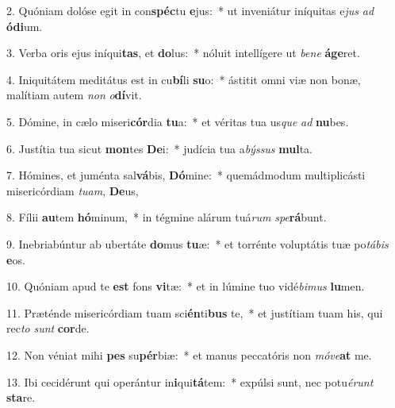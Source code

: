 2. Quóniam dolóse egit in con\textbf{spéc}tu \textbf{e}jus:~*  ut inveniátur iníquitas e\textit{jus} \textit{ad} \textbf{ó}\textbf{di}um.\

3. Verba oris ejus iníqui\textbf{tas}, et \textbf{do}lus:~*  nóluit intellígere ut \textit{be}\textit{ne} \textbf{á}\textbf{ge}ret.\

4. Iniquitátem meditátus est in cu\textbf{bí}li \textbf{su}o:~*  ástitit omni viæ non bonæ, malítiam autem \textit{non} \textit{o}\textbf{dí}vit.\

5. Dómine, in cælo miseri\textbf{cór}dia \textbf{tu}a:~*  et véritas tua us\textit{que} \textit{ad} \textbf{nu}bes.\

6. Justítia tua sicut \textbf{mon}tes \textbf{De}i:~*  judícia tua a\textit{býs}\textit{sus} \textbf{mul}ta.\

7. Hómines, et juménta sal\textbf{vá}bis, \textbf{Dó}mine:~*  quemádmodum multiplicásti misericórdiam \textit{tu}\textit{am}, \textbf{De}us,\

8. Fílii \textbf{au}tem \textbf{hó}minum,~*  in tégmine alárum tuá\textit{rum} \textit{spe}\textbf{rá}bunt.\

9. Inebriabúntur ab ubertáte \textbf{do}mus \textbf{tu}æ:~*  et torrénte voluptátis tuæ po\textit{tá}\textit{bis} \textbf{e}os.\

10. Quóniam apud te \textbf{est} fons \textbf{vi}tæ:~*  et in lúmine tuo vidé\textit{bi}\textit{mus} \textbf{lu}men.\

11. Præténde misericórdiam tuam sci\textbf{én}ti\textbf{bus} te,~*  et justítiam tuam his, qui rec\textit{to} \textit{sunt} \textbf{cor}de.\

12. Non véniat mihi \textbf{pes} su\textbf{pér}biæ:~*  et manus peccatóris non \textit{mó}\textit{ve}\textbf{at} me.\

13. Ibi cecidérunt qui operántur in\textbf{i}qui\textbf{tá}tem:~*  expúlsi sunt, nec potu\textit{é}\textit{runt} \textbf{sta}re.\

